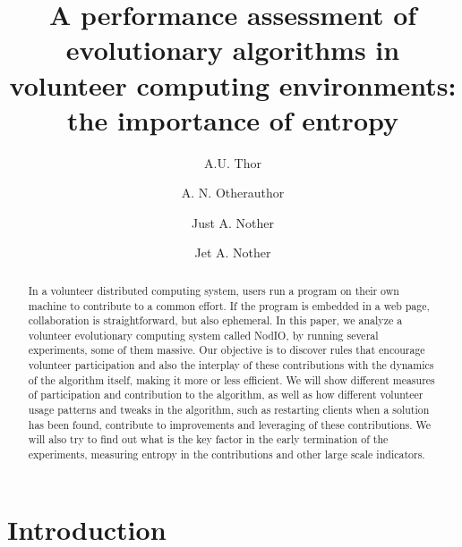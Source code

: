 \documentclass[runningheads,a4paper]{llncs}\usepackage[]{graphicx}\usepackage[]{color}
\begin{document}



\title{A performance assessment of evolutionary algorithms in
  volunteer computing environments: the importance of entropy} 




\author{A.U. Thor \and A. N. Otherauthor \and Just A. Nother 
  \and Jet A. Nother }



\maketitle


\begin{abstract}
In a volunteer distributed computing system, users run a program on
their own machine to contribute to a common effort. If the program is
embedded in a web page, collaboration is straightforward, but also ephemeral. In
this paper, we analyze a volunteer evolutionary computing system called
NodIO, by running several experiments, some of them massive. Our
objective is to discover rules that encourage volunteer
participation and also the interplay of these contributions with the
dynamics of the algorithm itself, making it more or less efficient. %
We will show different measures of
participation and contribution to the algorithm, as well as how different 
volunteer usage patterns and tweaks in the algorithm, such as
restarting clients when a solution has been found, contribute to 
improvements and leveraging of these contributions. We will also try
to find out what is the key factor in the early termination of the
experiments, measuring entropy in the contributions and other large
scale indicators.
\end{abstract}

\section{Introduction}
\label{introduction}
\end{document}
